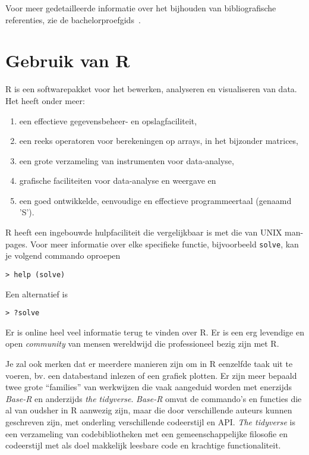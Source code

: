 Voor meer gedetailleerde informatie over het bijhouden van bibliografische referenties, zie de bachelorproefgids~\autocite{VanVreckem2017}.

\section{Gebruik van R}

R is een softwarepakket voor het bewerken, analyseren en visualiseren van data. Het heeft onder meer:

\begin{enumerate}
  \item een effectieve gegevensbeheer- en opslagfaciliteit,
  \item een reeks operatoren voor berekeningen op arrays, in het bijzonder matrices,
  \item een grote verzameling van instrumenten voor data-analyse,
  \item grafische faciliteiten voor data-analyse en weergave en
  \item een goed ontwikkelde, eenvoudige en effectieve programmeertaal (genaamd 'S').
\end{enumerate}

R heeft een ingebouwde hulpfaciliteit die vergelijkbaar is met die van UNIX man-pages. Voor meer informatie over elke specifieke functie, bijvoorbeeld \texttt{solve}, kan je volgend commando oproepen

\begin{lstlisting}
> help (solve)
\end{lstlisting}

Een alternatief is
\begin{lstlisting}
> ?solve
\end{lstlisting}

Er is online heel veel informatie terug te vinden over R. Er is een erg levendige en open \textit{community} van mensen wereldwijd die professioneel bezig zijn met R.

Je zal ook merken dat er meerdere manieren zijn om in R eenzelfde taak uit te voeren, bv. een databestand inlezen of een grafiek plotten. Er zijn meer bepaald twee grote ``families'' van werkwijzen die vaak aangeduid worden met enerzijds \textit{Base-R} en anderzijds \textit{the tidyverse}. \textit{Base-R} omvat de commando's en functies die al van oudsher in R aanwezig zijn, maar die door verschillende auteurs kunnen geschreven zijn, met onderling verschillende codeerstijl en API. \textit{The tidyverse} is een verzameling van codebibliotheken met een gemeenschappelijke filosofie en codeerstijl met als doel makkelijk leesbare code en krachtige functionaliteit.


